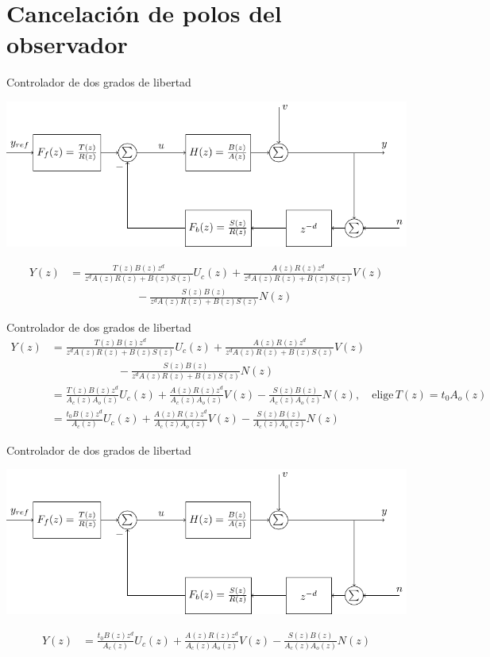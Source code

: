 \documentclass[presentation,aspectratio=169]{beamer}
\begin{document}
\section{Cancelación de polos del observador}
\label{sec:org6e95e45}
\begin{frame}[label={sec:org9169ded}]{Controlador de dos grados de libertad}
\begin{center}
\includegraphics[width=0.7\linewidth]{../../figures/2dof-block-explicit}
\end{center}

\begin{align*}
Y(z) &= \frac{T(z)B(z)z^d}{z^dA(z)R(z) + B(z)S(z)}U_c(z) + \frac{A(z)R(z)z^d}{z^dA(z)R(z) + B(z)S(z)}V(z)\\ & \qquad\qquad\qquad - \frac{S(z)B(z)}{z^dA(z)R(z) + B(z)S(z)}N(z)
\end{align*}
\end{frame}




\begin{frame}[label={sec:orgbff86ef}]{Controlador de dos grados de libertad}
\begin{align*}
Y(z) &= \frac{T(z)B(z)z^d}{z^dA(z)R(z) + B(z)S(z)}U_c(z) + \frac{A(z)R(z)z^d}{z^dA(z)R(z) + B(z)S(z)}V(z)\\ & \qquad\qquad\qquad - \frac{S(z)B(z)}{z^dA(z)R(z) + B(z)S(z)}N(z)\\
     &= \frac{T(z)B(z)z^d}{A_c(z)A_o(z)}U_c(z) + \frac{A(z)R(z)z^d}{A_c(z)A_o(z)}V(z)- \frac{S(z)B(z)}{A_c(z)A_o(z)}N(z), \quad \text{elige}\, T(z) = t_0A_o(z)\\
     &= \frac{t_0B(z)z^d}{A_c(z)}U_c(z) + \frac{A(z)R(z)z^d}{A_c(z)A_o(z)}V(z)- \frac{S(z)B(z)}{A_c(z)A_o(z)}N(z)
\end{align*}
\end{frame}

\begin{frame}[label={sec:orgc5273ad}]{Controlador de dos grados de libertad}
\begin{center}
\includegraphics[width=0.7\linewidth]{../../figures/2dof-block-explicit}
\end{center}
\begin{align*}
Y(z) &= \frac{t_0B(z)z^d}{A_c(z)}U_c(z) + \frac{A(z)R(z)z^d}{A_c(z)A_o(z)}V(z)- \frac{S(z)B(z)}{A_c(z)A_o(z)}N(z)
\end{align*}
\end{frame}
\end{document}
